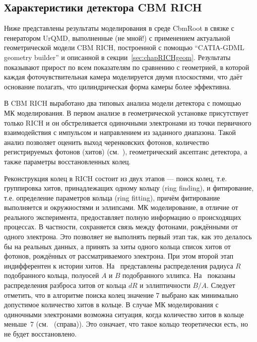 %                                                                     

\subsection{Характеристики детектора CBM RICH}\label{sec:secCbmRichOptimiz}

Ниже представлены результаты моделирования в среде CbmRoot в связке с генератором UrQMD, выполненные (\todo не мной!) с применением актуальной геометрической модели CBM RICH, построенной с помощью ``CATIA-GDML geometry builder'' и описанной в секции~\ref{sec:chapRICHgeom}.
Результаты показывают прирост по всем показателям по сравнению с геометрией, в которой каждая фоточувствительная камера моделируется двумя плоскостями, что даёт основание полагать, что цилиндрическая форма камеры более эффективна.

В CBM RICH выработано два типовых анализа модели детектора с помощью МК моделирования. В первом анализе в геометрической установке присутствует только RICH и он обстреливается одиночными электронами из точки первичного взаимодействия с импульсом и направлением из заданного диапазона. Такой анализ позволяет оценить выход черенковских фотонов, количество регистрируемых фотонов (хитов) (см.~), геометрический аксептанс детектора, а также параметры восстановленных колец.

Реконструкция колец в RICH состоит из двух этапов --- поиск колец, т.е. группировка хитов, принадлежащих одному кольцу (ring finding), и фитирование, т.е. определение параметров кольца (ring fitting), причём фитирование выполняется и окружностями и эллипсами.
МК моделирование, в отличие от реального эксперимента, предоставляет полную информацию о происходящих процессах. В частности, сохраняется связь между фотонами, рождёнными от одного электрона. Это позволяет не выполнять первый этап так, как это делалось бы на реальных данных, а принять за хиты одного кольца список хитов от фотонов, рождённых от рассматриваемого электрона.
При этом второй этап индифферентен к истории хитов.
На~ представлены распределения радиуса $R$ подобранного кольца, полуосей $A$ и $B$ подобранного эллипса. На~ показаны распределения разброса хитов от кольца $dR$ и эллиптичности $B/A$.
Следует отметить, что в алгоритме поиска колец значение 7 выбрано как минимально допустимое количество хитов в кольце.
В случае МК моделирования с одиночными электронами возможна ситуация, когда количество хитов в кольце меньше~7 (см.~ (справа)). Это означает, что такое кольцо теоретически есть, но не будет восстановлено.

